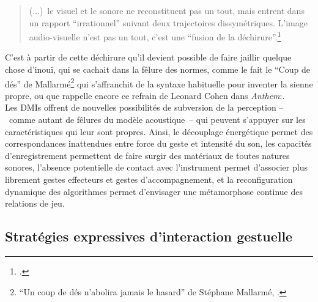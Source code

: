 \begin{quotation}
(...)~le visuel et le sonore ne reconstituent pas un tout, mais entrent dans un rapport ``irrationnel'' suivant deux trajectoires dissymétriques. L'image audio-visuelle n'est pas un tout, c'est une ``fusion de la déchirure''.\footnote{\cite[p.~351]{deleuze_image-temps_1985}.}
\end{quotation}
\noindent C'est à partir de cette déchirure qu'il devient possible de faire jaillir quelque chose d'inouï, qui se cachait dans la fêlure des normes, comme le fait le ``Coup de dés'' de Mallarmé\footnote{``Un coup de dés n'abolira jamais le hasard'' de Stéphane Mallarmé, \cite{mallarme_coup_1914}.} qui s'affranchit de la syntaxe habituelle pour inventer la sienne propre, ou que rappelle encore ce refrain de Leonard Cohen dans \textit{Anthem}:.\\
\indent Les \glspl{DMI} offrent de nouvelles possibilités de subversion de la perception --~comme autant de fêlures du modèle acoustique~-- qui peuvent s'appuyer sur les caractéristiques qui leur sont propres. Ainsi, le découplage énergétique permet des correspondances inattendues entre force du geste et intensité du son, les capacités d'enregistrement permettent de faire surgir des matériaux de toutes natures sonores, l'absence potentielle de contact avec l'instrument permet d'associer plus librement gestes effecteurs et gestes d'accompagnement, et la reconfiguration dynamique des algorithmes permet d'envisager une métamorphose continue des relations de jeu.

\subsection{Stratégies expressives d'interaction gestuelle}

